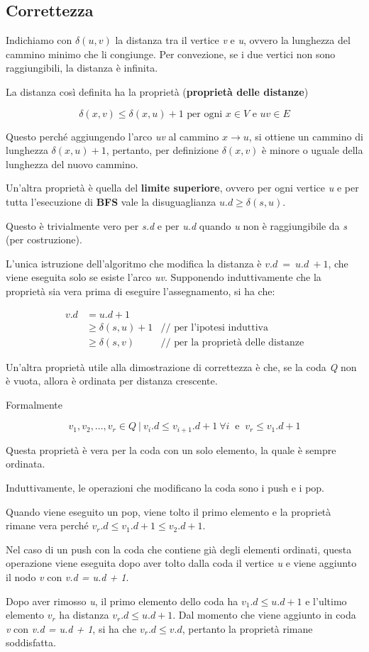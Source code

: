 \subsection{Correttezza}\label{correttezza}

Indichiamo con $\delta(u,v)$ la distanza tra il vertice \emph{v} e
\emph{u}, ovvero la lunghezza del cammino minimo che li congiunge. Per
convezione, se i due vertici non sono raggiungibili, la distanza è
infinita.

La distanza così definita ha la proprietà (\textbf{proprietà delle distanze}) 

$$\delta(x,v) \leq \delta(x,u) + 1 \text{ per ogni } x \in V \text{ e } uv \in E$$
 
Questo perché aggiungendo l'arco \emph{uv} al cammino $ x \rightarrow u$, si ottiene un cammino di
lunghezza $\delta(x,u) + 1$, pertanto, per definizione $\delta(x,v)$ è
minore o uguale della lunghezza del nuovo cammino.

Un'altra proprietà è quella del \textbf{limite superiore}, ovvero per
ogni vertice \emph{u} e per tutta l'esecuzione di \textbf{BFS} vale la
disuguaglianza $u.d \geq \delta(s,u)$.

Questo è trivialmente vero per \emph{s.d} e per \emph{u.d} quando \emph{u} non è raggiungibile da \emph{s} (per costruzione).

L'unica istruzione dell'algoritmo che modifica la distanza è
$v.d\ =\ u.d\ + 1$, che viene eseguita solo se esiste l'arco
\emph{uv}. Supponendo induttivamente che la proprietà sia vera prima di
eseguire l'assegnamento, si ha che:

\begin{align*}
v.d &= u.d + 1 &\\
     &\geq \delta(s,u) + 1 & \text{// per l'ipotesi induttiva }\\
     &\geq \delta(s,v)   & \text{// per la proprietà delle distanze}
\end{align*}

Un'altra proprietà utile alla dimostrazione di correttezza è che, se la
coda \emph{Q} non è vuota, allora è ordinata per distanza crescente.

Formalmente

$$
v_1, v_2, \ldots, v_r \in Q \: | \:  v_i.d \leq v_{i+1}.d + 1 \: \forall i \: \text{ e } \: v_r \leq v_1.d +1
$$

Questa proprietà è vera per la coda con un solo elemento, la quale è
sempre ordinata.

Induttivamente, le operazioni che modificano la coda sono i push e i
pop.

Quando viene eseguito un pop, viene tolto il primo elemento e la
proprietà rimane vera perché $v_r.d \leq v_1.d + 1 \leq v_2.d + 1$.

Nel caso di un push con la coda che contiene già degli elementi
ordinati, questa operazione viene eseguita dopo aver tolto dalla coda il
vertice \emph{u} e viene aggiunto il nodo \emph{v} con \emph{v.d = u.d +
1}.

Dopo aver rimosso \emph{u}, il primo elemento dello coda ha  $v_1.d \leq u.d + 1$ e l'ultimo elemento $v_r$ ha distanza
$v_r.d \leq u.d +1$. Dal momento che viene aggiunto in
coda \emph{v} con \emph{v.d = u.d + 1}, si ha che $v_r.d \leq v.d$, pertanto la proprietà rimane soddisfatta.
